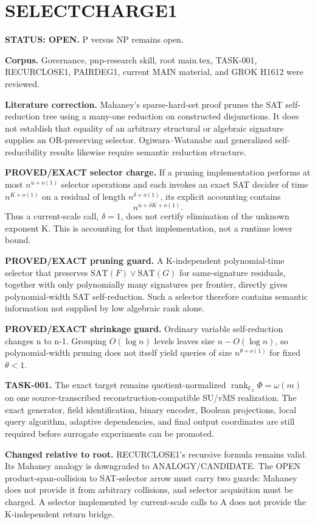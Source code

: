 \documentclass{article}
\begin{document}
\section*{SELECTCHARGE1}
\textbf{STATUS: OPEN.} P versus NP remains open.

\textbf{Corpus.} Governance, pnp-research skill, root main.tex, TASK-001, RECURCLOSE1, PAIRDEG1, current MAIN material, and GROK H1612 were reviewed.

\textbf{Literature correction.} Mahaney's sparse-hard-set proof prunes the SAT self-reduction tree using a many-one reduction on constructed disjunctions. It does not establish that equality of an arbitrary structural or algebraic signature supplies an OR-preserving selector. Ogiwara--Watanabe and generalized self-reducibility results likewise require semantic reduction structure.

\textbf{PROVED/EXACT selector charge.} If a pruning implementation performs at most \(n^{u+o(1)}\) selector operations and each invokes an exact SAT decider of time \(n^{K+o(1)}\) on a residual of length \(n^{\delta+o(1)}\), its explicit accounting contains
\[
n^{u+\delta K+o(1)}.
\]
Thus a current-scale call, \(\delta=1\), does not certify elimination of the unknown exponent K. This is accounting for that implementation, not a runtime lower bound.

\textbf{PROVED/EXACT pruning guard.} A K-independent polynomial-time selector that preserves \(\mathrm{SAT}(F)\vee\mathrm{SAT}(G)\) for same-signature residuals, together with only polynomially many signatures per frontier, directly gives polynomial-width SAT self-reduction. Such a selector therefore contains semantic information not supplied by low algebraic rank alone.

\textbf{PROVED/EXACT shrinkage guard.} Ordinary variable self-reduction changes n to n-1. Grouping \(O(\log n)\) levels leaves size \(n-O(\log n)\), so polynomial-width pruning does not itself yield queries of size \(n^{\theta+o(1)}\) for fixed \(\theta<1\).

\textbf{TASK-001.} The exact target remains quotient-normalized \(\operatorname{rank}_{\mathbb F_2}\Phi=\omega(m)\) on one source-transcribed reconstruction-compatible SU/vMS realization. The exact generator, field identification, binary encoder, Boolean projections, local query algorithm, adaptive dependencies, and final output coordinates are still required before surrogate experiments can be promoted.

\textbf{Changed relative to root.} RECURCLOSE1's recursive formula remains valid. Its Mahaney analogy is downgraded to ANALOGY/CANDIDATE. The OPEN product-span-collision to SAT-selector arrow must carry two guards: Mahaney does not provide it from arbitrary collisions, and selector acquisition must be charged. A selector implemented by current-scale calls to A does not provide the K-independent return bridge.
\end{document}
